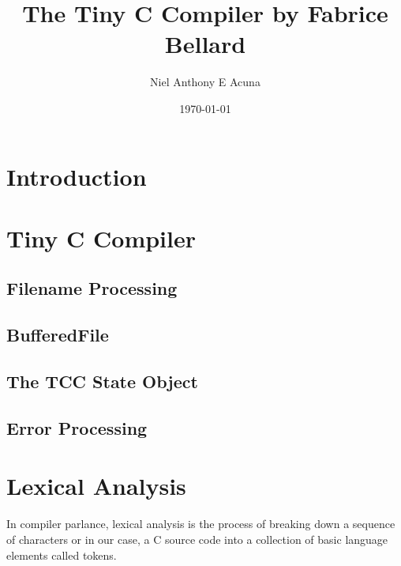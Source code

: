 \documentclass[11pt, oneside]{book}              %
\title{\bf The Tiny C Compiler by Fabrice Bellard}    %
\author{Niel Anthony E Acuna}              %
\date{\today}                           %
\begin{document}
\frontmatter                            %
\maketitle                              %
\tableofcontents                        %




\mainmatter                             %


\part{Introduction}                   %



\part{Tiny C Compiler}







\chapter{Filename Processing}

\chapter{BufferedFile}

\chapter{The TCC State Object}

\chapter{Error Processing}

\part{Lexical Analysis}

In compiler parlance, lexical analysis is the process of breaking down a sequence of characters or in our case, a C source code into a collection of basic language elements called tokens.
\end{document}
